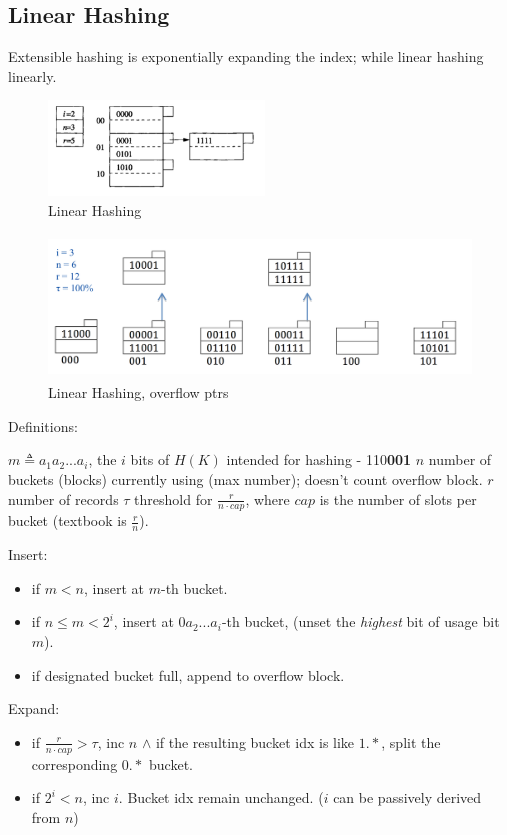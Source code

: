 \documentclass[a4paper]{report}
\begin{document}
\subsection{Linear Hashing}
Extensible hashing is exponentially expanding the index; while linear hashing  linearly. 
\begin{figure}[H]
    \centerline{\includegraphics[height = 1in]{img/linearhashing}}
    \caption{Linear Hashing}
  \label{fig:linearHashing}
\end{figure}
\begin{figure}[H]
    \centerline{\includegraphics[height = 1.5in]{img/linearHahsing2}}
    \caption{Linear Hashing, overflow ptrs}
  \label{fig:linearHashing2}
\end{figure}
Definitions:
\begin{itemize}
\treeitem $m \triangleq a_1a_2...a_i$, the $i$  bits of $H(K)$ intended for hashing - 110\textbf{001}
\treeitem $n$ number of buckets (blocks) currently using (max number); doesn't count overflow block. 
\treeitem $r$ number of records
\treeitem $\tau$ threshold for $\frac{r}{n\cdot cap}$, where $cap$ is the number of slots per bucket (textbook is $\frac{r}{n}$).
\end{itemize}
Insert: 
\begin{itemize}
\item if $m<n$, insert at $m$-th bucket.
\item if $n\leq m < 2^i$, insert at $0a_2...a_i$-th bucket, (unset the \textit{highest} bit of usage bit $m$).
\item if designated bucket full, append to overflow block. 
\end{itemize}
Expand:
\begin{itemize}
\item if $\frac{r}{n\cdot cap}>\tau$, inc $n$ $\wedge$ if the resulting bucket idx is like $1.*$, split the corresponding $0.*$ bucket. 
\item if $2^i<n$, inc $i$. Bucket idx remain unchanged. ($i$ can be passively derived from $n$) 
\end{itemize}
\end{document}
